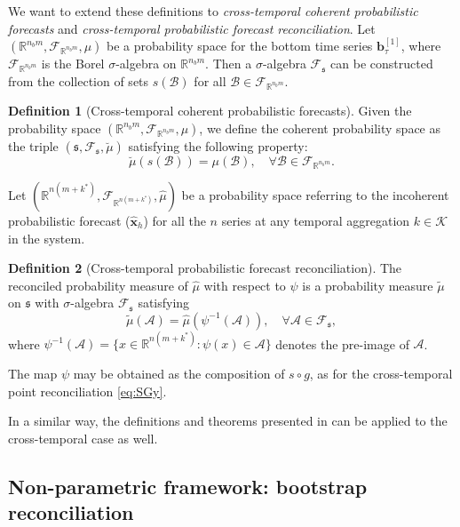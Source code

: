 \documentclass[a4paper,11pt]{article}
\newcommand{\bvet}{\bm{b}}
\newcommand{\xvet}{\bm{x}}
\theoremstyle{definition}
\newtheorem{definition}{Definition}[section]
\begin{document}
We want to extend these definitions to \textit{cross-temporal coherent probabilistic forecasts} and \textit{cross-temporal probabilistic forecast reconciliation}.
Let $(\mathbb{R}^{n_b m}, \mathcal{F}_{\mathbb{R}^{n_b m}}, \mu)$ be a probability space for the bottom time series $\bvet_{\tau}^{[1]}$, where $\mathcal{F}_{\mathbb{R}^{n_b m}}$ is the Borel $\sigma$-algebra on $\mathbb{R}^{n_b m}$. Then a $\sigma$-algebra $\mathcal{F}_{\mathfrak{s}}$ can be constructed from the collection of sets $s(\mathcal{B})$ for all $\mathcal{B} \in \mathcal{F}_{\mathbb{R}^{n_b m}}$.
\begin{definition}[Cross-temporal coherent probabilistic forecasts]
	Given the probability space $(\mathbb{R}^{n_b m}, \mathcal{F}_{\mathbb{R}^{n_b m}}, \mu)$, we define the coherent probability space as the triple $(\mathfrak{s}, \mathcal{F}_{\mathfrak{s}}, \breve{\mu})$ satisfying the following property:
	$$
		\breve{\mu}(s(\mathcal{B}))=\mu(\mathcal{B}), \quad \forall \mathcal{B} \in \mathcal{F}_{\mathbb{R}^{n_b m}} .
	$$
\end{definition}
Let $(\mathbb{R}^{n(m+k^\ast)}, \mathcal{F}_{\mathbb{R}^{n(m+k^\ast)}}, \hat{\mu})$ be a probability space referring to the incoherent probabilistic forecast ($\widehat{\xvet}_{h}$) for all the $n$ series at any temporal aggregation $k \in \mathcal{K}$ in the system.
\begin{definition}[Cross-temporal probabilistic forecast reconciliation]\label{def:pfr}
	The reconciled probability measure of $\hat{\mu}$ with respect to $\psi$ is a probability measure $\tilde{\mu}$ on $\mathfrak{s}$ with $\sigma$-algebra $\mathcal{F}_{\mathfrak{s}}$ satisfying
	\begin{equation}\label{eq:pfr}
		\tilde{\mu}(\mathcal{A})=\hat{\mu}(\psi^{-1}(\mathcal{A})), \quad \forall \mathcal{A} \in \mathcal{F}_{\mathfrak{s}},
	\end{equation}
	where $\psi^{-1}(\mathcal{A})=\{x \in \mathbb{R}^{n(m+k^\ast)}: \psi(x) \in \mathcal{A}\}$ denotes the pre-image of $\mathcal{A}$.
\end{definition}
The map $\psi$ may be obtained as the composition of $s \circ g$, as for the cross-temporal point reconciliation \eqref{eq:SGy}.

In a similar way, the definitions and theorems presented in \citet{corani2021} can be applied to the cross-temporal case as well.

\subsection{Non-parametric framework: bootstrap reconciliation}\label{ssec:boot}
\end{document}
